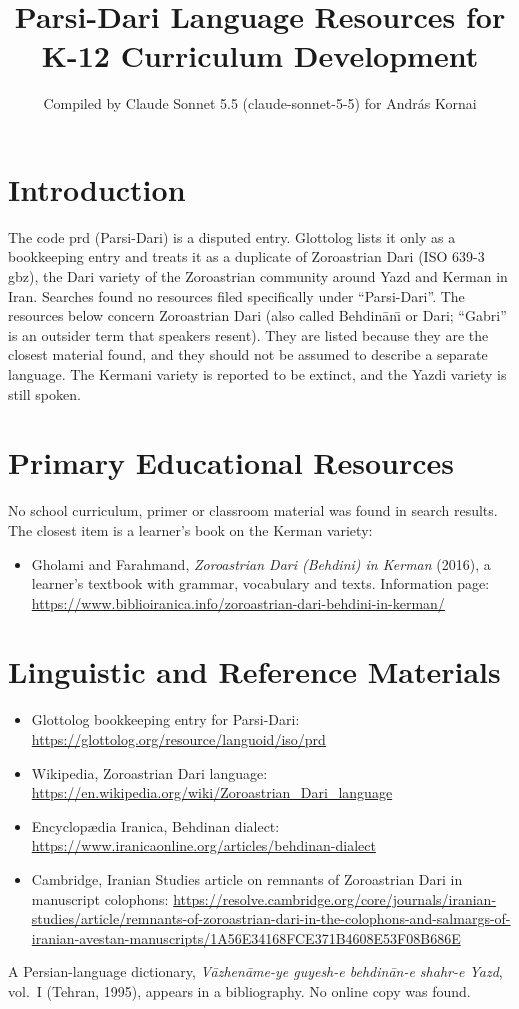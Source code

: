 \documentclass[12pt]{article}
\title{Parsi-Dari Language Resources for K-12 Curriculum Development}
\author{Compiled by Claude Sonnet 5.5 (claude-sonnet-5-5) for Andr\'as Kornai}
\date{}
\begin{document}
\maketitle

\section{Introduction}
The code prd (Parsi-Dari) is a disputed entry. Glottolog lists it only as a bookkeeping entry and treats it as a duplicate of Zoroastrian Dari (ISO 639-3 gbz), the Dari variety of the Zoroastrian community around Yazd and Kerman in Iran. Searches found no resources filed specifically under ``Parsi-Dari''. The resources below concern Zoroastrian Dari (also called Behdin\={a}n\={\i} or Dari; ``Gabri'' is an outsider term that speakers resent). They are listed because they are the closest material found, and they should not be assumed to describe a separate language. The Kermani variety is reported to be extinct, and the Yazdi variety is still spoken.

\section{Primary Educational Resources}
No school curriculum, primer or classroom material was found in search results. The closest item is a learner's book on the Kerman variety:
\begin{itemize}
\item Gholami and Farahmand, \emph{Zoroastrian Dari (Behdini) in Kerman} (2016), a learner's textbook with grammar, vocabulary and texts. Information page: \url{https://www.biblioiranica.info/zoroastrian-dari-behdini-in-kerman/}
\end{itemize}

\section{Linguistic and Reference Materials}
\begin{itemize}
\item Glottolog bookkeeping entry for Parsi-Dari: \url{https://glottolog.org/resource/languoid/iso/prd}
\item Wikipedia, Zoroastrian Dari language: \url{https://en.wikipedia.org/wiki/Zoroastrian_Dari_language}
\item Encyclop\ae dia Iranica, Behdinan dialect: \url{https://www.iranicaonline.org/articles/behdinan-dialect}
\item Cambridge, Iranian Studies article on remnants of Zoroastrian Dari in manuscript colophons: \url{https://resolve.cambridge.org/core/journals/iranian-studies/article/remnants-of-zoroastrian-dari-in-the-colophons-and-salmargs-of-iranian-avestan-manuscripts/1A56E34168FCE371B4608E53F08B686E}
\end{itemize}
A Persian-language dictionary, \emph{V\={a}zhen\={a}me-ye guyesh-e behdin\={a}n-e shahr-e Yazd}, vol.\ I (Tehran, 1995), appears in a bibliography. No online copy was found.
\end{document}
